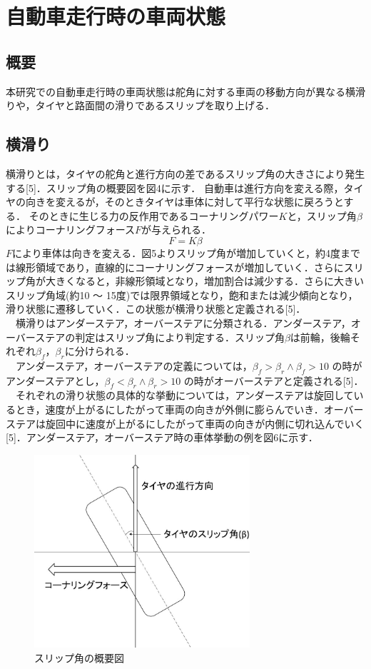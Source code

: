 \documentclass[twocolumn]{jsarticle}
\begin{document}
\section{自動車走行時の車両状態}
\subsection{概要}
本研究での自動車走行時の車両状態は舵角に対する車両の移動方向が異なる横滑りや，タイヤと路面間の滑りであるスリップを取り上げる．
\subsection{横滑り}
横滑りとは，タイヤの舵角と進行方向の差であるスリップ角の大きさにより発生する[5]．スリップ角の概要図を図4に示す．
自動車は進行方向を変える際，タイヤの向きを変えるが，そのときタイヤは車体に対して平行な状態に戻ろうとする．
そのときに生じる力の反作用であるコーナリングパワー$K$と，スリップ角$β$によりコーナリングフォース$F$が与えられる．
   \begin{equation}
   \label{equation1}
      F = Kβ
   \end{equation}
$F$により車体は向きを変える．図5よりスリップ角が増加していくと，約4度までは線形領域であり，直線的にコーナリングフォースが増加していく．さらにスリップ角が大きくなると，非線形領域となり，増加割合は減少する．さらに大きいスリップ角域(約10 ～ 15度)では限界領域となり，飽和または減少傾向となり，滑り状態に遷移していく．この状態が横滑り状態と定義される[5]．
\\　横滑りはアンダーステア，オーバーステアに分類される．アンダーステア，オーバーステアの判定はスリップ角により判定する．スリップ角$β$は前輪，後輪それぞれ$β_f$，$β_r$に分けられる．
\\　アンダーステア，オーバーステアの定義については，$β_f > β_r \land β_f > 10$ の時がアンダーステアとし，$β_f < β_r \land β_r > 10$ の時がオーバーステアと定義される[5]．
\\　それぞれの滑り状態の具体的な挙動については，アンダーステアは旋回しているとき，速度が上がるにしたがって車両の向きが外側に膨らんでいき．オーバーステアは旋回中に速度が上がるにしたがって車両の向きが内側に切れ込んでいく[5]．アンダーステア，オーバーステア時の車体挙動の例を図6に示す．
\begin{figure}[H]
	\centering
	\includegraphics[width=8cm]{slip_angle.jpg}
	\caption{スリップ角の概要図}
	\label{fig04}
\end{figure}
\end{document}
